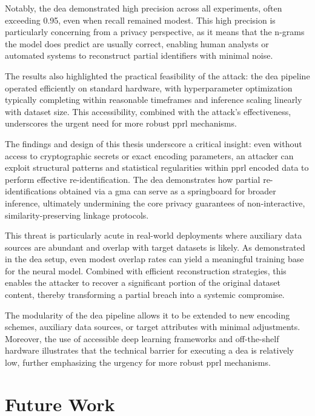 Notably, the \ac{dea} demonstrated high precision across all experiments, often exceeding 0.95, even when recall remained modest.
This high precision is particularly concerning from a privacy perspective, as it means that the n-grams the model does predict are usually correct, enabling human analysts or automated systems to reconstruct partial identifiers with minimal noise.

The results also highlighted the practical feasibility of the attack: the \ac{dea} pipeline operated efficiently on standard hardware, with hyperparameter optimization typically completing within reasonable timeframes and inference scaling linearly with dataset size.
This accessibility, combined with the attack's effectiveness, underscores the urgent need for more robust \ac{pprl} mechanisms.

The findings and design of this thesis underscore a critical insight: even without access to cryptographic secrets or exact encoding parameters, an attacker can exploit structural patterns and statistical regularities within \ac{pprl} encoded data to perform effective re-identification.
The \ac{dea} demonstrates how partial re-identifications obtained via a \ac{gma} can serve as a springboard for broader inference, ultimately undermining the core privacy guarantees of non-interactive, similarity-preserving linkage protocols.

This threat is particularly acute in real-world deployments where auxiliary data sources are abundant and overlap with target datasets is likely.
As demonstrated in the \ac{dea} setup, even modest overlap rates can yield a meaningful training base for the neural model.
Combined with efficient reconstruction strategies, this enables the attacker to recover a significant portion of the original dataset content, thereby transforming a partial breach into a systemic compromise.

The modularity of the \ac{dea} pipeline allows it to be extended to new encoding schemes, auxiliary data sources, or target attributes with minimal adjustments.
Moreover, the use of accessible deep learning frameworks and off-the-shelf hardware illustrates that the technical barrier for executing a \ac{dea} is relatively low, further emphasizing the urgency for more robust \ac{pprl} mechanisms.


\section{Future Work}  \label{sec:future-work}

